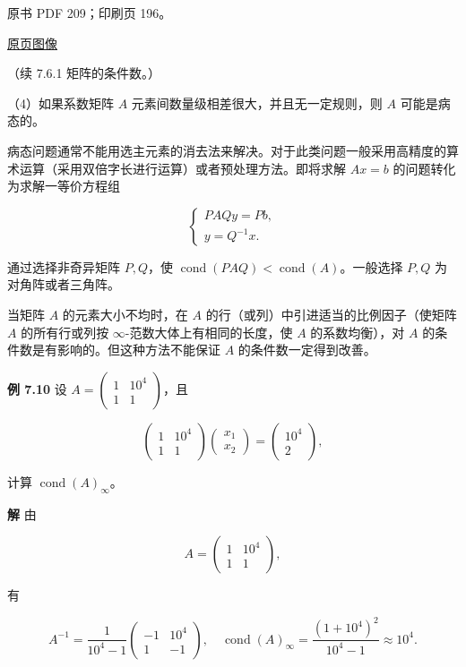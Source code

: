 \documentclass[
  10pt,
  fontset=fandol]{ctexart}
\begin{document}
\clearpage

原书 PDF 209；印刷页 196。

\href{/Users/xiangjunfeng/Desktop/数值计算专用/numerical-analysis/book/source-images/pdf-209.jpeg}{原页图像}

（续 7.6.1 矩阵的条件数。）

（4）如果系数矩阵 \(A\) 元素间数量级相差很大，并且无一定规则，则 \(A\)
可能是病态的。

病态问题通常不能用选主元素的消去法来解决。对于此类问题一般采用高精度的算术运算（采用双倍字长进行运算）或者预处理方法。即将求解
\(Ax=b\) 的问题转化为求解一等价方程组

\[
\begin{cases}
PAQy=Pb,\\
y=Q^{-1}x.
\end{cases}
\]

通过选择非奇异矩阵 \(P,Q\)，使
\(\operatorname{cond}(PAQ)<\operatorname{cond}(A)\)。一般选择 \(P,Q\)
为对角阵或者三角阵。

当矩阵 \(A\) 的元素大小不均时，在 \(A\)
的行（或列）中引进适当的比例因子（使矩阵 \(A\) 的所有行或列按
\(\infty\)-范数大体上有相同的长度，使 \(A\) 的系数均衡），对 \(A\)
的条件数是有影响的。但这种方法不能保证 \(A\) 的条件数一定得到改善。

\textbf{例 7.10} 设 \(A=\begin{pmatrix}1&10^4\\1&1\end{pmatrix}\)，且

\[
\begin{pmatrix}1&10^4\\1&1\end{pmatrix}
\begin{pmatrix}x_1\\x_2\end{pmatrix}
=\begin{pmatrix}10^4\\2\end{pmatrix},
\tag{7.6.9}
\]

计算 \(\operatorname{cond}(A)_\infty\)。

\textbf{解} 由

\[
A=\begin{pmatrix}1&10^4\\1&1\end{pmatrix},
\]

有

\[
A^{-1}=\frac1{10^4-1}\begin{pmatrix}-1&10^4\\1&-1\end{pmatrix},\quad
\operatorname{cond}(A)_\infty=\frac{(1+10^4)^2}{10^4-1}\approx10^4.
\]
\end{document}
